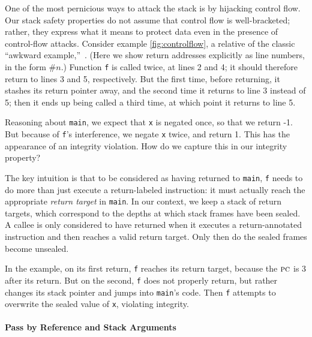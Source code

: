 \documentclass[acmsmall,review,anonymous]{acmart}\settopmatter{printfolios=true,printccs=false,printacmref=false}
\begin{document}
One of the most pernicious ways to attack the stack is by hijacking control flow.
Our stack safety properties do not assume that control flow is
well-bracketed; rather,
they express what it means to protect data even in the presence of control-flow attacks.
Consider example \ref{fig:controlflow}, a relative of the classic ``awkward example,''~\citep{??}.
(Here we show return addresses explicitly as line numbers, in the form $\#n$.)
Function {\tt f} is called twice, at lines 2 and 4; it should therefore return to lines
3 and 5, respectively. But the first time, before returning, it stashes its
return pointer away, and the second time it returns to line 3 instead of 5; then it ends
up being called a third time, at which point it returns to line 5.

Reasoning about {\tt main}, we expect that {\tt x} is negated once, so that we return
-1. But because of {\tt f}'s interference, we negate {\tt x} twice, and return 1.
This has the appearance of an integrity violation.  How do we capture this in our
integrity property?

The key intuition is that to be considered as having returned to {\tt main}, {\tt f} needs to do more than just
execute a return-labeled instruction: it must actually reach the appropriate
{\em return target} in {\tt main}. In our context, we keep
a stack of return targets,
which correspond to the depths at which stack frames have been sealed. A callee is
only considered to have returned when it executes a return-annotated instruction
and then reaches a valid return target. Only then do the sealed frames become unsealed.

In the example, on its first return, {\tt f} reaches its return target, because the
\(\textsc{pc}\) is 3 after its return. But on the second, {\tt f} does not properly return,
but rather changes its stack pointer and jumps into {\tt main}'s code. Then {\tt f}
attempts to overwrite the sealed value of {\tt x}, violating integrity.

\paragraph*{Pass by Reference and Stack Arguments}
\end{document}
